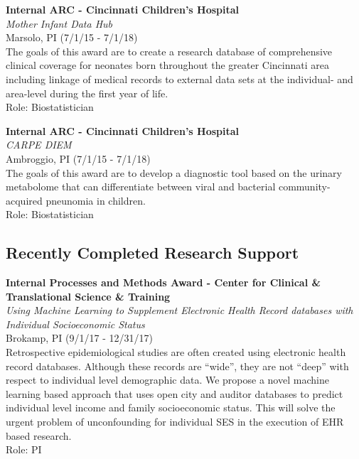 \documentclass{nihbiosketch}
\begin{document}
\bigskip

\textbf{Internal ARC - Cincinnati Children's Hospital}\\
\emph{Mother Infant Data Hub}\\
Marsolo, PI (7/1/15 - 7/1/18)\\
The goals of this award are to create a research database of
comprehensive clinical coverage for neonates born throughout the greater
Cincinnati area including linkage of medical records to external data
sets at the individual- and area-level during the first year of life.\\
Role: Biostatistician

\bigskip

\textbf{Internal ARC - Cincinnati Children's Hospital}\\
\emph{CARPE DIEM}\\
Ambroggio, PI (7/1/15 - 7/1/18)\\
The goals of this award are to develop a diagnostic tool based on the
urinary metabolome that can differentiate between viral and bacterial
community-acquired pneunomia in children.\\
Role: Biostatistician


\subsection*{Recently Completed Research Support}

\bigskip

\textbf{Internal Processes and Methods Award - Center for Clinical \&
	Translational Science \& Training}\\
\emph{Using Machine Learning to Supplement Electronic Health Record
	databases with Individual Socioeconomic Status}\\
Brokamp, PI (9/1/17 - 12/31/17)\\
Retrospective epidemiological studies are often created using electronic
health record databases. Although these records are ``wide'', they are
not ``deep'' with respect to individual level demographic data. We
propose a novel machine learning based approach that uses open city and
auditor databases to predict individual level income and family
socioeconomic status. This will solve the urgent problem of
unconfounding for individual SES in the execution of EHR based
research.\\
Role: PI
\end{document}
